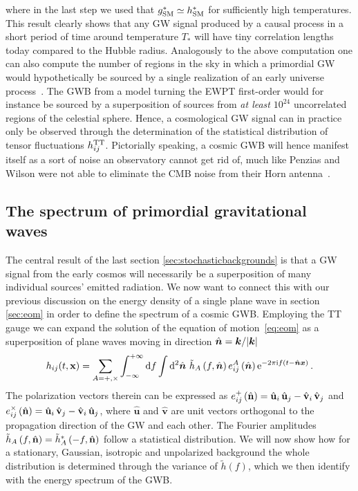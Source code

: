 where in the last step we used that $g_{\text{SM}}^* \simeq h_{\text{SM}}^*$ for sufficiently high temperatures. This result clearly shows that any \ac{GW} signal produced by a causal process in a short period of time around temperature $T_*$ will have tiny correlation lengths today compared to the Hubble radius. Analogously to the above computation one can also compute the number of regions in the sky in which a primordial \ac{GW} would hypothetically be sourced by a single realization of an early universe process~\cite{Caprini:2018mtu}. The \ac{GWB} from  a model turning the \ac{EWPT} first-order would for instance be sourced by a superposition of sources from \textit{at least} $10^{24}$ uncorrelated regions of the celestial sphere. Hence, a cosmological \ac{GW} signal can in practice only be observed through the determination of the statistical distribution of tensor fluctuations $h_{ij}^{\text{TT}}$. Pictorially speaking, a cosmic \ac{GWB} will hence manifest itself as a sort of noise an observatory cannot get rid of, much like Penzias and Wilson were not able to eliminate the \ac{CMB} noise from their Horn antenna~\cite{Penzias:1965wn}.

\subsection{The spectrum of primordial gravitational waves} \label{sec:spectrum}
The central result of the last section \ref{sec:stochasticbackgrounds} is that a \ac{GW} signal from the early cosmos  will necessarily be a superposition of many individual sources' emitted radiation. We now want to connect this with our previous discussion on the energy density of a single plane wave in section \ref{sec:eom} in order to define the spectrum of a cosmic \ac{GWB}. Employing the \ac{TT} gauge we can expand the solution of the equation of motion~\eqref{eq:eom}  as a superposition of plane waves moving in direction $\hat{\bm{n}} = \bm{k} / \lvert\bm{k}\rvert$
\begin{align}
	h_{ij}(t, \mathbf{x}) = \sum_{A = + , \times} \int_{- \infty}^{+ \infty} \mathop{}\!\mathrm{d} f \int \mathop{}\!\mathrm{d^2} \hat{\bm{n}} \  \tilde{h}_A\left( f, \hat{\bm{n}} \right) e_{ij}^A\left( \hat{\bm{n}} \right) \mathrm{e}^{- 2 \pi  \mathrm{i}  f (t- \hat{\bm{n}} \bm{x})} \, .
	\label{eq:planewaveexpansion}
\end{align}
The polarization vectors therein can be expressed as $e_{ij}^+ \left( \hat{\mathbf{n}} \right) = \hat{\mathbf{u}}_i \,\hat{\mathbf{u}}_j - \hat{\mathbf{v}}_i\, \hat{\mathbf{v}}_j$ and $e_{ij}^\times \left( \hat{\mathbf{n}} \right) = \hat{\mathbf{u}}_i \,\hat{\mathbf{v}}_j - \hat{\mathbf{v}}_i \,\hat{\mathbf{u}}_j$, where $\hat{\mathbf{u}}$ and $\hat{\mathbf{v}}$ are unit vectors orthogonal to the propagation direction of the \ac{GW} and each other. The Fourier amplitudes $\tilde{h}_A\left( f, \hat{\mathbf{n}} \right) = \tilde{h}_A^*\left( -f, \hat{\mathbf{n}} \right)$ follow a statistical distribution. We will now show how for a stationary, Gaussian, isotropic and unpolarized background the whole distribution is determined through the variance of $\tilde{h}(f)$, which we then identify with the energy spectrum of the \ac{GWB}.

